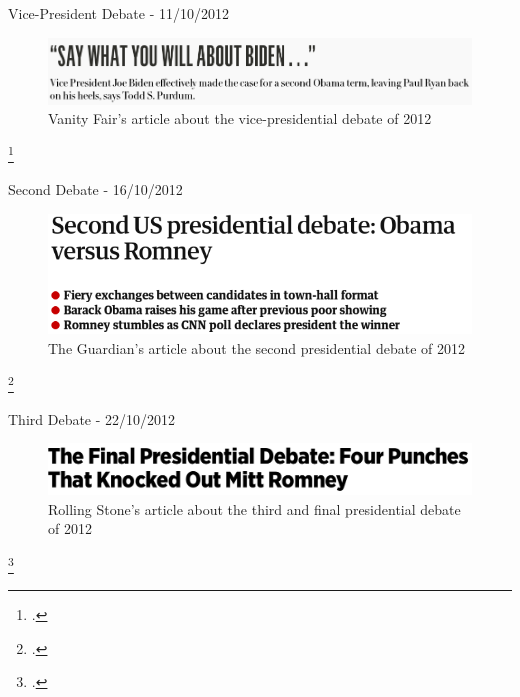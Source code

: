 \documentclass[aspectratio=169,notes]{beamer}
\begin{document}
\begin{frame}{Vice-President Debate - 11/10/2012}
 \begin{figure}[htp]
 \centering
 \includegraphics[width=\linewidth]{vp_debate.png}
 \caption{Vanity Fair's article about the vice-presidential debate of 2012\footnotemark}
\end{figure}
\footcitetext{vp_debate}
\end{frame}

\begin{frame}{Second Debate - 16/10/2012}
 \begin{figure}[htp]
 \centering
 \includegraphics[width=\linewidth]{second_debate.png}
 \caption{The Guardian's article about the second presidential debate of 2012\footnotemark}
\end{figure}
\footcitetext{second_debate}
\end{frame}

\begin{frame}{Third Debate - 22/10/2012}
 \begin{figure}[htp]
 \centering
 \includegraphics[width=\linewidth]{third_debate.png}
 \caption{Rolling Stone's article about the third and final presidential debate of 2012\footnotemark}
\end{figure}
\footcitetext{third_debate}
\end{frame}
\end{document}
